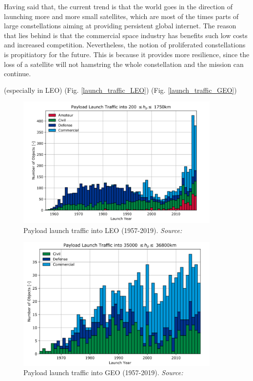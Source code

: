 
Having said that, the current trend is that the world goes in the direction of launching more and more small satellites, which are most of the times parts of large constellations aiming at providing persistent global internet. The reason that lies behind is that the commercial space industry has benefits such low costs and increased competition. Nevertheless, the notion of proliferated constellations is propitiatory for the future. This is because it provides more resilience, since the loss of a satellite will not hamstring the whole constellation and the mission can continue.

(especially in LEO)
(Fig. \ref{launch_traffic_LEO}) (Fig. \ref{launch_traffic_GEO}) 

\begin{figure}
\centering
\includegraphics[width=0.9\textwidth]{Images/launch_traffic_LEO.png}\caption{Payload launch traffic into LEO (1957-2019). \textit{Source: \cite{ESA 2019}}}
\label{launch_traffic} 
\end{figure}

\begin{figure}
\centering
\includegraphics[width=0.9\textwidth]{Images/launch_traffic_GEO.png}\caption{Payload launch traffic into GEO (1957-2019). \textit{Source: \cite{ESA 2019}}}
\label{launch_traffic} 
\end{figure}

